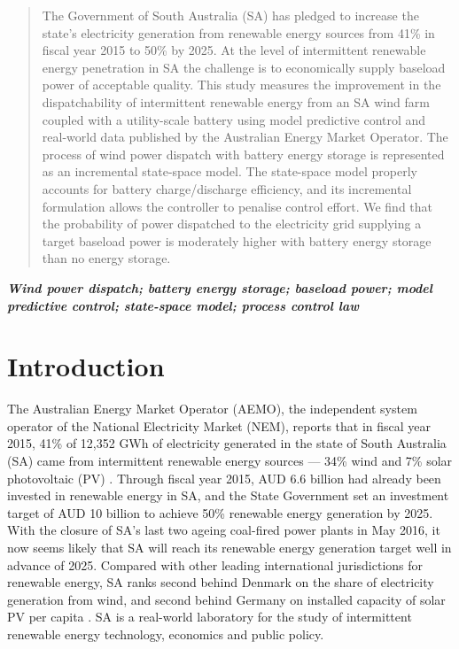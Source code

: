 \documentclass[conference]{IEEEtran}
\begin{document}
\begin{abstract}
The Government of South Australia (SA) has pledged to increase the state's electricity generation from renewable energy sources from 41\% in fiscal year 2015 to 50\% by 2025.  At the level of intermittent renewable energy penetration in SA the challenge is to economically supply baseload power of acceptable quality.  This study measures the improvement in the dispatchability of intermittent renewable energy from an SA wind farm coupled with a utility-scale battery using model predictive control and real-world data published by the Australian Energy Market Operator.  The process of wind power dispatch with battery energy storage is represented as an incremental state-space model.  The state-space model properly accounts for battery charge/discharge efficiency, and its incremental formulation allows the controller to penalise control effort.  We find that the probability of power dispatched to the electricity grid supplying a target baseload power is moderately higher with battery energy storage than no energy storage.
\end{abstract}

{\small \textbf{\textit{Wind power dispatch; battery energy storage; baseload power; model predictive control; state-space model; process control law}}}

\section{Introduction}
The Australian Energy Market Operator (AEMO), the independent system operator of the National Electricity Market (NEM), reports that in fiscal year 2015, 41\% of 12,352 GWh of electricity generated in the state of South Australia (SA) came from intermittent renewable energy sources --- 34\% wind and 7\% solar photovoltaic (PV) \citep{SAER15}.  Through fiscal year 2015, AUD 6.6 billion had already been invested in renewable energy in SA, and the State Government set an investment target of AUD 10 billion to achieve 50\% renewable energy generation by 2025.  With the closure of SA's last two ageing coal-fired power plants in May 2016, it now seems likely that SA will reach its renewable energy generation target well in advance of 2025.  Compared with other leading international jurisdictions for renewable energy, SA ranks second behind Denmark on the share of electricity generation from wind, and second behind Germany on installed capacity of solar PV per capita \citep{SAGOV15}.  SA is a real-world laboratory for the study of intermittent renewable energy technology, economics and public policy.
\end{document}
